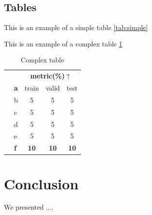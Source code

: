         
    \subsection{Tables}
        This is an example of a simple table \ref{tab:simple}

        \begin{table}[H]
        \centering
        \caption{Simple table}
        \label{tab:simple}
        \end{table}

        This is an example of a complex table \ref{tab:complex}
        
        \begin{table}[htbp]
        \begin{center}
        
        \begin{tabular}{|c|l|c|c|c|}
        \cline{3-5}
        \multicolumn{2}{c|}{}&\multicolumn{3}{|c|}{\textbf{metric(\%)$\uparrow$}}\\
        \cline{2-5}
        \multicolumn{1}{c|}{}&\textbf{a} & train & valid & test  \\
        \hline
        
        \parbox[t]{2mm}{}
        & b      &   5   &   5  &   5  \\
        & c      &   5   &   5  &   5  \\
        \hline
        \hline
        
        \parbox[t]{2mm}{} 
        & d      &   5  &   5   &   5  \\
        & e            &   5   &   5   &   5  \\
        \hline
        \hline   

        &\textbf{f} &   \textbf{10}   &   \textbf{10}   &   \textbf{10} \\
        \hline
        
        \end{tabular}
        \caption{Complex table}
        \label{tab:complex}
        \end{center}
        \end{table}


        
\section*{Conclusion}
    We presented ....